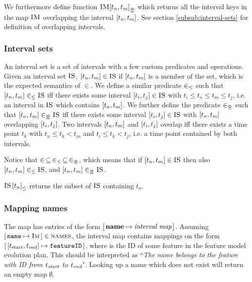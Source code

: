 We furthermore define function $\overlapping{\map{IM}}{t_n}{t_m}$ which returns all the interval keys in the map $\textsc{IM}$ overlapping the interval $\interval{t_n}{t_m}$. See section \vref{subsub:interval-sets} for definition of overlapping intervals. 

\subsubsection{Interval sets}
\label{subsub:interval-sets}
An interval set is a set of intervals with a few custom predicates and operations. Given an interval set $\textsc{IS}$, $\interval{t_n}{t_m} \in \map{IS}$ if $\interval{t_n}{t_m}$ is a member of the set, which is the expected semantics of $\in$. We define a similar predicate $\in_\leq$ such that $\interval{t_n}{t_m} \inn \map{IS}$ iff there exists some interval $\interval{t_i}{t_j} \in \map{IS}$ with $t_i \leq t_n \leq t_m \leq t_j$, i.e. an interval in $\textsc{IS}$ which contains $\interval{t_n}{t_m}$. We further define the predicate $\in_{\leq\!\!\!\!\geq}$ such that $\interval{t_n}{t_m} \innr \map{IS}$ iff there exists some interval $\interval{t_i}{t_j} \in \map{IS}$ with $\interval{t_n}{t_m}$ overlapping $\interval{t_i}{t_j}$. Two intervals $\interval{t_n}{t_m}$ and $\interval{t_i}{t_j}$ overlap iff there exists a time point $t_k$ with $t_n \leq t_k < t_m$ and $t_i \leq t_k < t_j$, i.e. a time point contained by both intervals.

Notice that $\in \, \subseteq \, \in_\leq \, \subseteq \, \in_{\leq\!\!\!\!\geq}$, which means that if $\interval{t_n}{t_m} \in \map{IS}$ then also $\interval{t_n}{t_m} \inn \map{IS}$, and $\interval{t_n}{t_m} \innr \map{IS}$.

${\textsc{IS} \left[ t_n \right]}_{\leq}$ returns the subset of $\textsc{IS}$ containing $t_n$.

\subsubsection{Mapping names}
\label{subsub:mapping-names}

The \names{} map has entries of the form $[ \,\textbf{name}{} \mapsto \textit{interval map}\, ]$. Assuming $[ \,\texttt{name} \mapsto \textsc{Im}\, ] \in \textsc{names}$, the interval map  contains mappings on the form $\intervalmapping{t_\text{start}}{t_\text{end}}{\var{featureID}}$, where  is the ID of some feature in the feature model evolution plan. This should be interpreted as ``\emph{The name \emph{} belongs to the feature with ID \emph{} from $t_{\emph{\text{start}}}$ to $t_{\emph{\text{end}}}$}". Looking up a name which does not exist will return an empty map $\emptyset$.

